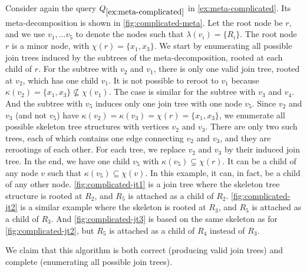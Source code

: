 \begin{algorithm}
{{{        } 
}

 \;
    
}

 \;
\end{algorithm}

\begin{example}
    Consider again the query $Q_{\ref{ex:meta-complicated}}$ in \cref{ex:meta-complicated}. Its meta-decomposition is shown in \cref{fig:complicated-meta}. Let the root node be $r$, and we use $v_1, \dots v_5$ to denote the nodes such that $\lambda(v_i) = \{ R_i \}$.
    The root node $r$ is a minor node, with $\chi (r) = \{ x_1, x_3 \}$.
    We start by enumerating all possible join trees induced by the subtrees of the meta-decomposition, rooted at each child of $r$.
    For the subtree with $v_2$ and $v_1$, there is only one valid join tree, rooted at $v_2$, which has one child $v_1$. It is not possible to reroot to $v_1$ because $\kappa(v_2) = \{ x_1, x_3 \} \not\subseteq \chi(v_1)$. The case is similar for the subtree with $v_3$ and $v_4$. And the subtree with $v_5$ induces only one join tree with one node $v_5$.
    Since $v_2$ and $v_3$ (and not $v_5$) have $\kappa(v_2) = \kappa(v_3) = \chi(r) = \{ x_1, x_3 \}$, we enumerate all possible skeleton tree structures with vertices $v_2$ and $v_3$.
    There are only two such trees, each of which contains one edge connecting $v_2$ and $v_3$, and they are rerootings of each other.
    For each tree, we replace $v_2$ and $v_3$ by their induced join tree.
    In the end, we have one child $v_5$ with $\kappa(v_5) \subsetneq \chi(r)$.
    It can be a child of any node $v$ such that $\kappa(v_5) \subseteq \chi(v)$. In this example, it can, in fact, be a child of any other node.
    \cref{fig:complicated-jt1} is a join tree where the skeleton tree structure is rooted at $R_2$, and $R_5$ is attached as a child of $R_2$. \cref{fig:complicated-jt2} is a similar example where the skeleton is rooted at $R_3$, and $R_5$ is attached as a child of $R_3$. And \cref{fig:complicated-jt3} is based on the same skeleton as for \cref{fig:complicated-jt2}, but $R_5$ is attached as a child of $R_4$ instead of $R_3$.
\end{example}

We claim that this algorithm is both correct (producing valid join trees) and complete (enumerating all possible join trees).

